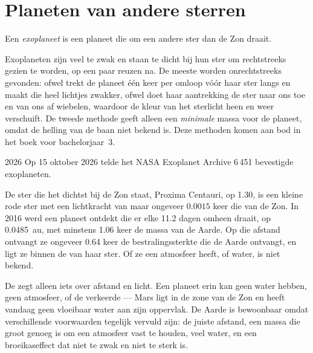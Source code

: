 \section{Planeten van andere sterren}

\begin{definition}[Exoplaneet]\label{def:g10:habitable-planet:exoplanet}
Een \emph{exoplaneet} is een planeet die om een andere ster
dan de Zon draait.
\end{definition}

Exoplaneten zijn veel te zwak en staan te dicht bij hun ster om rechtstreeks
gezien te worden, op een paar reuzen na. De meeste worden onrechtstreeks
gevonden: ofwel trekt de planeet één keer per omloop vóór haar ster langs en
maakt die heel lichtjes zwakker, ofwel doet haar aantrekking de ster naar ons
toe en van ons af wiebelen, waardoor de kleur van het sterlicht heen en weer
verschuift. De tweede methode geeft alleen een \emph{minimale} massa voor de
planeet, omdat de helling van de baan niet bekend is. Deze methoden komen aan
bod in het boek voor bachelorjaar~3.

\begin{dated}{2026}
Op 15 oktober 2026 telde het NASA Exoplanet Archive 6\,451 bevestigde
exoplaneten.
\end{dated}

\begin{example}[Proxima b]\label{ex:g10:habitable-planet:proxima}
De ster die het dichtst bij de Zon staat, Proxima Centauri, op \qty{1.30}{\parsec}, is een
kleine rode ster met een lichtkracht van maar ongeveer $0.0015$ keer die van
de Zon. In 2016 werd een planeet ontdekt die er elke 11.2 dagen omheen draait,
op \qty{0.0485}{au}, met minstens 1.06 keer de massa van de Aarde. Op die
afstand ontvangt ze ongeveer 0.64 keer de bestralingssterkte die de Aarde
ontvangt, en ligt ze binnen de  van haar ster. Of ze een
atmosfeer heeft, of water, is niet bekend.
\end{example}

\begin{remark}\label{rem:g10:habitable-planet:inhabited}
De  zegt alleen iets over afstand en licht. Een planeet erin
kan geen water hebben, geen atmosfeer, of de verkeerde --- Mars ligt in de
zone van de Zon en heeft vandaag geen vloeibaar water aan zijn oppervlak. De
Aarde is bewoonbaar omdat verschillende voorwaarden tegelijk vervuld zijn: de
juiste afstand, een massa die groot genoeg is om een atmosfeer vast te houden,
veel water, en een broeikaseffect dat niet te zwak en niet te sterk is.
\end{remark}


